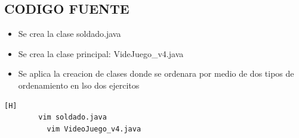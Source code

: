 \documentclass{article}
\begin{document}
	\subsection{CODIGO FUENTE}
	\begin{itemize}	
		\item Se crea la clase soldado.java
		\item Se crea la clase principal:   VideJuego_v4.java
\item 	Se aplica la creacion de clases donde se ordenara por medio de dos tipos de ordenamiento en lso dos ejercitos
			
	\end{itemize}
	
	\begin{lstlisting}[language=bash,caption={Creando la clase soldado y la clase VideoJuego_v4}][H]
		vim soldado.java
		  vim VideoJuego_v4.java
	\end{lstlisting}
	
\end{document}
